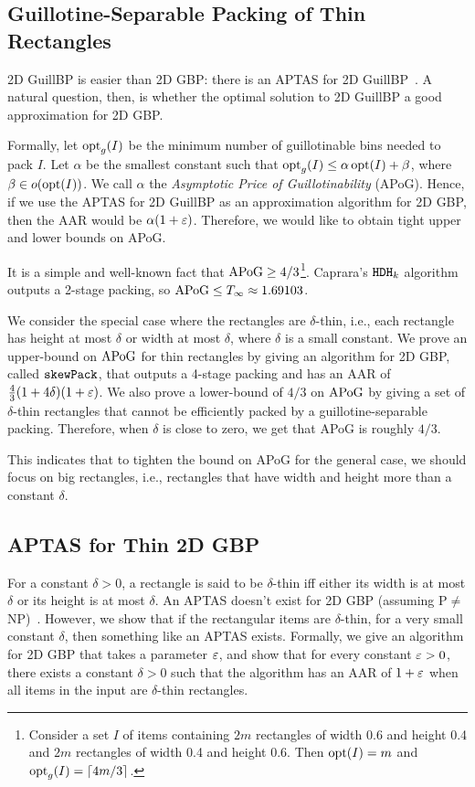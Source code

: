 \subsection{Guillotine-Separable Packing of Thin Rectangles}

2D GuillBP is easier than 2D GBP: there is an APTAS for 2D GuillBP~\cite{bansal2005tale}.
A natural question, then, is whether the optimal solution to 2D GuillBP
a good approximation for 2D GBP.

Formally, let $\operatorname{opt}_g(I)$ be the minimum number of guillotinable bins needed to pack $I$.
Let $\alpha$ be the smallest constant such that
$\operatorname{opt}_g(I) \le \alpha\operatorname{opt}(I) + \beta$, where $\beta \in o(\operatorname{opt}(I))$.
We call $\alpha$ the \emph{Asymptotic Price of Guillotinability} (APoG).
Hence, if we use the APTAS for 2D GuillBP as an approximation algorithm for 2D GBP,
then the AAR would be $\alpha(1 + \varepsilon)$.
Therefore, we would like to obtain tight upper and lower bounds on APoG.

It is a simple and well-known fact that $\mathrm{APoG} \ge 4/3$\footnote{Consider
a set $I$ of items containing $2m$ rectangles of width 0.6 and height 0.4 and
$2m$ rectangles of width 0.4 and height 0.6.
Then $\operatorname{opt}(I) = m$ and $\operatorname{opt}_g(I) = \left\lceil 4m/3 \right\rceil$.}.
Caprara's $\operatorname{\mathtt{HDH}}_{k}$ algorithm~\cite{caprara2008} outputs a 2-stage packing,
so $\mathrm{APoG} \le T_{\infty} \approx 1.69103$.

We consider the special case where the rectangles are $\delta$-thin,
i.e., each rectangle has height at most $\delta$ or width at most $\delta$,
where $\delta$ is a small constant.
We prove an upper-bound on $\mathrm{APoG}$ for thin rectangles by
giving an algorithm for 2D GBP, called $\operatorname{\mathtt{skewPack}}$,
that outputs a 4-stage packing and has an AAR of $\frac{4}{3}(1+4\delta)(1+\varepsilon)$.
We also prove a lower-bound of $4/3$ on $\mathrm{APoG}$ by giving
a set of $\delta$-thin rectangles that cannot be efficiently
packed by a guillotine-separable packing.
Therefore, when $\delta$ is close to zero, we get that APoG is roughly $4/3$.

This indicates that to tighten the bound on APoG for the general case,
we should focus on big rectangles, i.e., rectangles that have width and height
more than a constant $\delta$.

\subsection{APTAS for Thin 2D GBP}

For a constant $\delta > 0$, a rectangle is said to be $\delta$-thin
iff either its width is at most $\delta$ or its height is at most $\delta$.
An APTAS doesn't exist for 2D GBP (assuming P$\neq$NP)~\cite{bansal2006bin}.
However, we show that if the rectangular items are $\delta$-thin,
for a very small constant $\delta$, then something like an APTAS exists.
Formally, we give an algorithm for 2D GBP that takes a parameter $\varepsilon$,
and show that for every constant $\varepsilon > 0$, there exists a constant $\delta > 0$
such that the algorithm has an AAR of $1+\varepsilon$
when all items in the input are $\delta$-thin rectangles.
